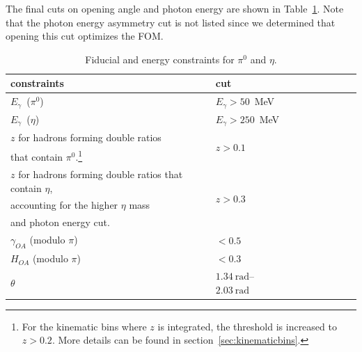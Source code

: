 The final cuts on opening angle and photon energy are shown in Table~\ref{tab:constrain}. Note that the photon energy asymmetry cut is not listed since we determined that opening this cut optimizes the FOM.

\begin{table}[H]\small
\centering
\begin{tabular}{|l|l|l|l|l|l|l|l|l|}
\hline
constraints & cut   \\ \hline
$E_\gamma$~($\pi^0$) & $E_\gamma >50$~MeV \\ \hline
$E_\gamma$~($\eta$) & $E_\gamma >250$~MeV \\ \hline
$z$  for hadrons forming double ratios &\multirow{2}{*}{$z>0.1$}\\
 that contain $\pi^0$.\footnote{For the kinematic bins where $z$ is  integrated, the threshold is increased to $z>0.2$. More details can be found in section~\ref{sec:kinematicbins}.}&  \\ \hline
$z$ for hadrons forming double ratios that contain $\eta$,& \multirow{3}{*}{$z>0.3$} \\ accounting for the higher $\eta$ mass &\\and photon energy cut. \\ \hline
$\gamma_{OA}$ (modulo $\pi$) & $<0.5$ \\ \hline
$H_{OA}$ (modulo $\pi$) & $<0.3$ \\ \hline
$\theta$ &  $1.34~\text{rad}$\textup{--}$ 2.03~\text{rad}$ \\ \hline
\end{tabular}
\caption{Fiducial and energy constraints for $\pi^0$ and $\eta$.}
\label{tab:constrain}
\end{table}

